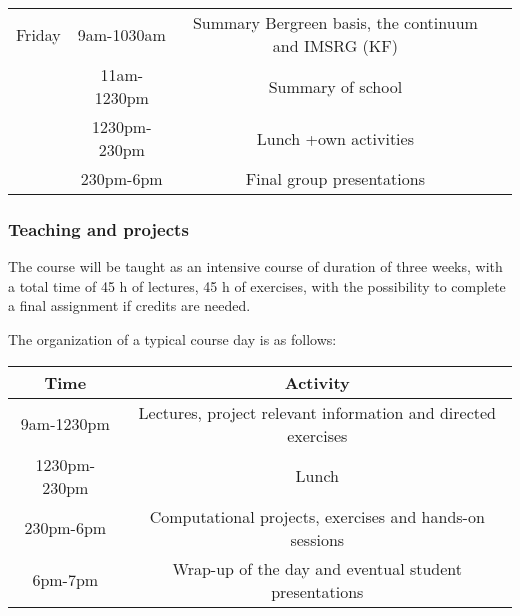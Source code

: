 \documentclass{beamer}
\begin{document}
\begin{frame}
\begin{block}{}
{\begin{tabular}{cccc}
\hline
Friday    & 9am-1030am   & Summary Bergreen basis, the continuum and IMSRG (KF) &                                                              \\
          & 11am-1230pm  & Summary of school                                    &                                                              \\
          & 1230pm-230pm & Lunch +own activities                                &                                                              \\
          & 230pm-6pm    & Final group presentations                            &                                                              \\
\hline
\end{tabular}
}

\noindent





\end{block}
\end{frame}

\begin{frame}
\frametitle{Teaching and projects}

\begin{block}{}

The course will be taught as an intensive  course of duration of three weeks, with a
total time of 45 h of lectures, 45 h of exercises, with the possibility to complete a final assignment if credits are needed.

The organization of a typical course day is as follows:


{\footnotesize
\begin{tabular}{cc}
\hline
\multicolumn{1}{c}{ Time } & \multicolumn{1}{c}{ Activity } \\
\hline
9am-1230pm   & Lectures, project relevant information and directed exercises \\
1230pm-230pm & Lunch                                                         \\
230pm-6pm    & Computational projects, exercises  and hands-on sessions      \\
6pm-7pm      & Wrap-up of the day and eventual student presentations         \\
\hline
\end{tabular}
}

\noindent
\end{block}
\end{frame}
\end{document}
